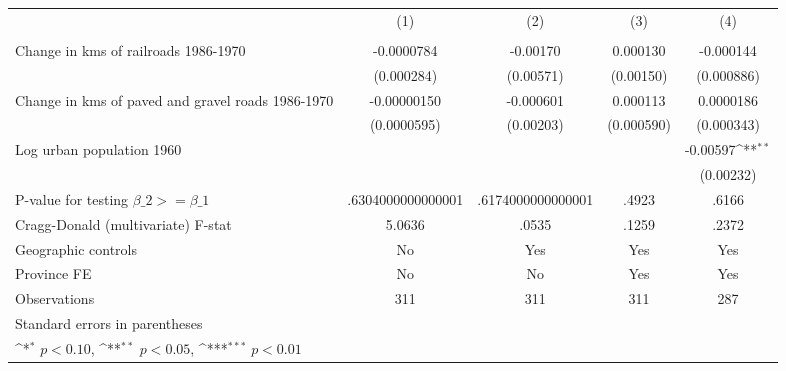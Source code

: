 {
\def\sym#1{\ifmmode^{#1}\else\(^{#1}\)\fi}
\begin{tabular}{l*{4}{c}}
\hline\hline
                &\multicolumn{1}{c}{(1)}&\multicolumn{1}{c}{(2)}&\multicolumn{1}{c}{(3)}&\multicolumn{1}{c}{(4)}\\
                &\multicolumn{1}{c}{}&\multicolumn{1}{c}{}&\multicolumn{1}{c}{}&\multicolumn{1}{c}{}\\
\hline
Change in kms of railroads 1986-1970&-0.0000784         & -0.00170         & 0.000130         &-0.000144         \\
                &(0.000284)         &(0.00571)         &(0.00150)         &(0.000886)         \\
[1em]
Change in kms of paved and gravel roads 1986-1970&-0.00000150         &-0.000601         & 0.000113         &0.0000186         \\
                &(0.0000595)         &(0.00203)         &(0.000590)         &(0.000343)         \\
[1em]
Log urban population 1960&                  &                  &                  & -0.00597\sym{**} \\
                &                  &                  &                  &(0.00232)         \\
\hline
P-value for testing $\beta\_{2} >= \beta\_{1}$&.6304000000000001         &.6174000000000001         &    .4923         &    .6166         \\
Cragg-Donald (multivariate) F-stat&   5.0636         &    .0535         &    .1259         &    .2372         \\
Geographic controls&       No         &      Yes         &      Yes         &      Yes         \\
Province FE     &       No         &       No         &      Yes         &      Yes         \\
Observations    &      311         &      311         &      311         &      287         \\
\hline\hline
\multicolumn{5}{l}{\footnotesize Standard errors in parentheses}\\
\multicolumn{5}{l}{\footnotesize \sym{*} \(p<0.10\), \sym{**} \(p<0.05\), \sym{***} \(p<0.01\)}\\
\end{tabular}
}
